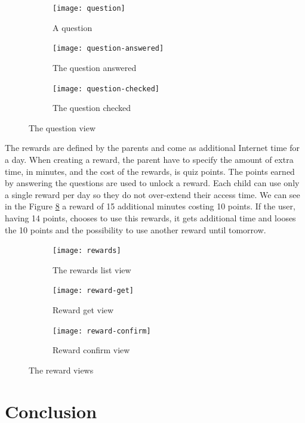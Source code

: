 \begin{figure}
\centering
\begin{subfigure}{.33\textwidth}
  \centering
  \texttt{[image: question]}
  \caption{A question}
  \label{fig:question}
\end{subfigure}%
\begin{subfigure}{.33\textwidth}
  \centering
  \texttt{[image: question-answered]}
  \caption{The question answered}
  \label{fig:question-answered}
\end{subfigure}
\begin{subfigure}{.33\textwidth}
  \centering
  \texttt{[image: question-checked]}
  \caption{The question checked}
  \label{fig:question-checked}
\end{subfigure}
\caption{The question view}
\label{fig:question-view}
\end{figure}

The rewards are defined by the parents and come as additional Internet time for a day. When creating a reward, the parent have to specify the amount of extra time, in minutes, and the cost of the rewards, is quiz points. The points earned by answering the questions are used to unlock a reward. Each child can use only a single reward per day so they do not over-extend their access time. We can see in the Figure \ref{fig:reward-views} a reward of 15 additional minutes costing 10 points. If the user, having 14 points, chooses to use this rewards, it gets additional time and looses the 10 points and the possibility to use another reward until tomorrow.

\begin{figure}
\centering
\begin{subfigure}{.33\textwidth}
  \centering
  \texttt{[image: rewards]}
  \caption{The rewards list view}
  \label{fig:rewards}
\end{subfigure}%
\begin{subfigure}{.33\textwidth}
  \centering
  \texttt{[image: reward-get]}
  \caption{Reward get view}
  \label{fig:reward-get}
\end{subfigure}
\begin{subfigure}{.33\textwidth}
  \centering
  \texttt{[image: reward-confirm]}
  \caption{Reward confirm view}
  \label{fig:reward-confirm}
\end{subfigure}
\caption{The reward views}
\label{fig:reward-views}
\end{figure}

\section{Conclusion}


